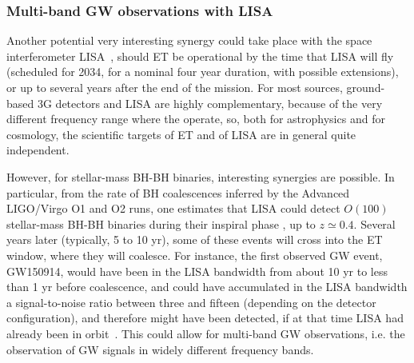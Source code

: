  
\subsubsection{Multi-band GW observations with LISA}

Another potential very interesting synergy could take place with the space interferometer LISA~\cite{Audley:2017drz}, should ET be operational  by the time that LISA will fly (scheduled for 2034, for a nominal four year duration, with possible extensions), or up to several years  after the end of the mission. For most sources, ground-based 3G detectors and LISA are highly complementary, because of the very different frequency range where the operate, so, both for astrophysics and for cosmology, the scientific targets of ET and of LISA are in  general quite independent. 

However, for stellar-mass BH-BH binaries, interesting synergies are possible.
In particular, from the rate of BH coalescences inferred by the Advanced LIGO/Virgo O1 and O2 runs, one estimates that  LISA could detect  $O(100)$ stellar-mass BH-BH  binaries during their inspiral phase \cite{Audley:2017drz}, up to $z\simeq 0.4$.   Several years later (typically, 5 to 10 yr),  some of these events will cross into the ET window, where they will coalesce. For instance, the first observed GW event, GW150914,  would have been  in the LISA bandwidth from  about 10 yr to less than 1 yr before coalescence, and 
could have accumulated in the LISA bandwidth a signal-to-noise ratio between three and fifteen (depending on the detector configuration), and therefore might have been detected, if  at that time LISA had already been  in orbit~\cite{Sesana:2016ljz}. This could allow for multi-band GW observations, i.e. the observation of GW signals in widely different frequency bands. 

